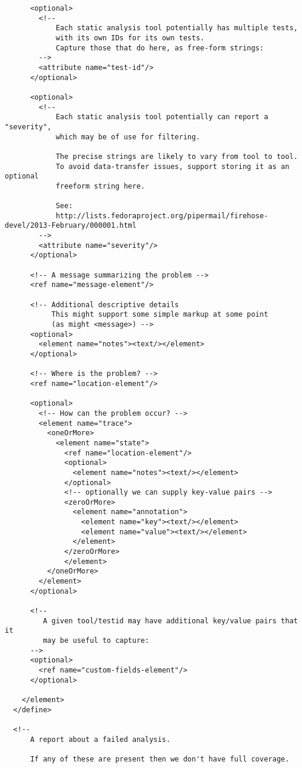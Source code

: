 \begin{lstlisting}
      <optional>
        <!--
            Each static analysis tool potentially has multiple tests,
            with its own IDs for its own tests.
            Capture those that do here, as free-form strings:
        -->
        <attribute name="test-id"/>
      </optional>

      <optional>
        <!--
            Each static analysis tool potentially can report a "severity",
            which may be of use for filtering.

            The precise strings are likely to vary from tool to tool.
            To avoid data-transfer issues, support storing it as an optional
            freeform string here.

            See:
            http://lists.fedoraproject.org/pipermail/firehose-devel/2013-February/000001.html
        -->
        <attribute name="severity"/>
      </optional>

      <!-- A message summarizing the problem -->
      <ref name="message-element"/>

      <!-- Additional descriptive details
           This might support some simple markup at some point
           (as might <message>) -->
      <optional>
        <element name="notes"><text/></element>
      </optional>

      <!-- Where is the problem? -->
      <ref name="location-element"/>

      <optional>
        <!-- How can the problem occur? -->
        <element name="trace">
          <oneOrMore>
            <element name="state">
              <ref name="location-element"/>
              <optional>
                <element name="notes"><text/></element>
              </optional>
              <!-- optionally we can supply key-value pairs -->
              <zeroOrMore>
                <element name="annotation">
                  <element name="key"><text/></element>
                  <element name="value"><text/></element>
                </element>
              </zeroOrMore>
              </element>
          </oneOrMore>
        </element>
      </optional>

      <!--
         A given tool/testid may have additional key/value pairs that it
         may be useful to capture:
      -->
      <optional>
        <ref name="custom-fields-element"/>
      </optional>

    </element>
  </define>

  <!--
      A report about a failed analysis.

      If any of these are present then we don't have full coverage.


\end{lstlisting}
